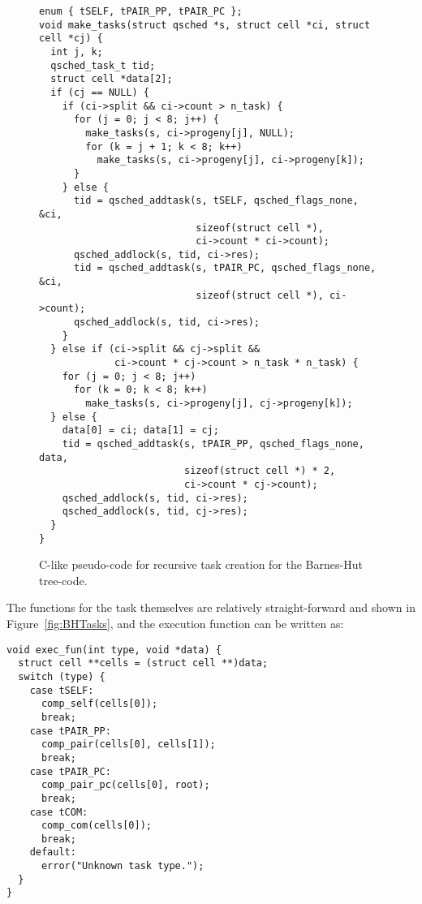 \documentclass[preprint]{elsarticle}
\newcommand{\fig}[1]
    {Figure~\ref{fig:#1}}
\begin{document}
\begin{figure}
\begin{center}\begin{minipage}{0.9\textwidth}
    \begin{lstlisting}[basicstyle=\scriptsize\tt]
enum { tSELF, tPAIR_PP, tPAIR_PC };
void make_tasks(struct qsched *s, struct cell *ci, struct cell *cj) {
  int j, k;
  qsched_task_t tid;
  struct cell *data[2];
  if (cj == NULL) {
    if (ci->split && ci->count > n_task) {
      for (j = 0; j < 8; j++) {
        make_tasks(s, ci->progeny[j], NULL);
        for (k = j + 1; k < 8; k++)
          make_tasks(s, ci->progeny[j], ci->progeny[k]);
      }
    } else {
      tid = qsched_addtask(s, tSELF, qsched_flags_none, &ci,
                           sizeof(struct cell *),
                           ci->count * ci->count);
      qsched_addlock(s, tid, ci->res);
      tid = qsched_addtask(s, tPAIR_PC, qsched_flags_none, &ci,
                           sizeof(struct cell *), ci->count);
      qsched_addlock(s, tid, ci->res);
    }
  } else if (ci->split && cj->split &&
             ci->count * cj->count > n_task * n_task) {
    for (j = 0; j < 8; j++)
      for (k = 0; k < 8; k++)
        make_tasks(s, ci->progeny[j], cj->progeny[k]);
  } else {
    data[0] = ci; data[1] = cj;
    tid = qsched_addtask(s, tPAIR_PP, qsched_flags_none, data,
                         sizeof(struct cell *) * 2,
                         ci->count * cj->count);
    qsched_addlock(s, tid, ci->res);
    qsched_addlock(s, tid, cj->res);
  }
}
    \end{lstlisting}
\end{minipage}\end{center}
    \caption{C-like pseudo-code for recursive task creation
        for the Barnes-Hut tree-code.}
    \label{fig:MakeTasks}
\end{figure}

The functions for the task themselves are relatively
straight-forward and shown in \fig{BHTasks}, and the
execution function can be written as:
\begin{center}\begin{minipage}{0.9\textwidth}
    \begin{lstlisting}
void exec_fun(int type, void *data) {
  struct cell **cells = (struct cell **)data;
  switch (type) {
    case tSELF:
      comp_self(cells[0]);
      break;
    case tPAIR_PP:
      comp_pair(cells[0], cells[1]);
      break;
    case tPAIR_PC:
      comp_pair_pc(cells[0], root);
      break;
    case tCOM:
      comp_com(cells[0]);
      break;
    default:
      error("Unknown task type.");
  }
}
    \end{lstlisting}
\end{minipage}\end{center}
\end{document}
